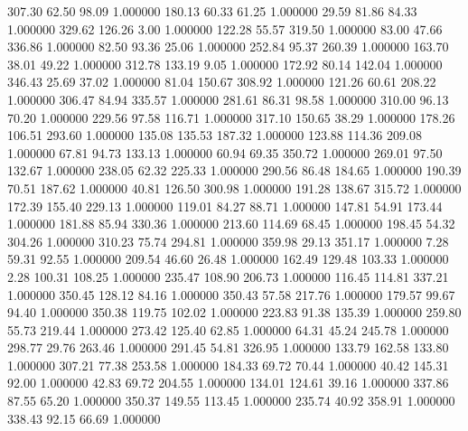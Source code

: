     307.30     62.50     98.09  1.000000
    180.13     60.33     61.25  1.000000
     29.59     81.86     84.33  1.000000
    329.62    126.26      3.00  1.000000
    122.28     55.57    319.50  1.000000
     83.00     47.66    336.86  1.000000
     82.50     93.36     25.06  1.000000
    252.84     95.37    260.39  1.000000
    163.70     38.01     49.22  1.000000
    312.78    133.19      9.05  1.000000
    172.92     80.14    142.04  1.000000
    346.43     25.69     37.02  1.000000
     81.04    150.67    308.92  1.000000
    121.26     60.61    208.22  1.000000
    306.47     84.94    335.57  1.000000
    281.61     86.31     98.58  1.000000
    310.00     96.13     70.20  1.000000
    229.56     97.58    116.71  1.000000
    317.10    150.65     38.29  1.000000
    178.26    106.51    293.60  1.000000
    135.08    135.53    187.32  1.000000
    123.88    114.36    209.08  1.000000
     67.81     94.73    133.13  1.000000
     60.94     69.35    350.72  1.000000
    269.01     97.50    132.67  1.000000
    238.05     62.32    225.33  1.000000
    290.56     86.48    184.65  1.000000
    190.39     70.51    187.62  1.000000
     40.81    126.50    300.98  1.000000
    191.28    138.67    315.72  1.000000
    172.39    155.40    229.13  1.000000
    119.01     84.27     88.71  1.000000
    147.81     54.91    173.44  1.000000
    181.88     85.94    330.36  1.000000
    213.60    114.69     68.45  1.000000
    198.45     54.32    304.26  1.000000
    310.23     75.74    294.81  1.000000
    359.98     29.13    351.17  1.000000
      7.28     59.31     92.55  1.000000
    209.54     46.60     26.48  1.000000
    162.49    129.48    103.33  1.000000
      2.28    100.31    108.25  1.000000
    235.47    108.90    206.73  1.000000
    116.45    114.81    337.21  1.000000
    350.45    128.12     84.16  1.000000
    350.43     57.58    217.76  1.000000
    179.57     99.67     94.40  1.000000
    350.38    119.75    102.02  1.000000
    223.83     91.38    135.39  1.000000
    259.80     55.73    219.44  1.000000
    273.42    125.40     62.85  1.000000
     64.31     45.24    245.78  1.000000
    298.77     29.76    263.46  1.000000
    291.45     54.81    326.95  1.000000
    133.79    162.58    133.80  1.000000
    307.21     77.38    253.58  1.000000
    184.33     69.72     70.44  1.000000
     40.42    145.31     92.00  1.000000
     42.83     69.72    204.55  1.000000
    134.01    124.61     39.16  1.000000
    337.86     87.55     65.20  1.000000
    350.37    149.55    113.45  1.000000
    235.74     40.92    358.91  1.000000
    338.43     92.15     66.69  1.000000
